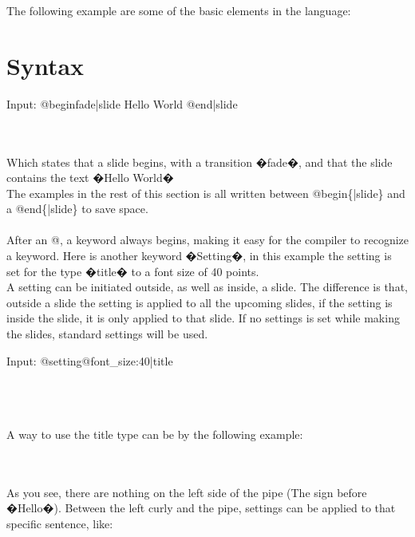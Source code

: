 The following example are some of the basic elements in the language:

\section{Syntax}

\begin{spverbatim}
Input:
@begin{fade|slide}
    Hello World
@end{|slide}
\end{spverbatim}

\\ \\
Which states that a slide begins, with a transition �fade�, and that the slide contains the text �Hello World� \\
The examples in the rest of this section is all written between @begin\{|slide\} and a @end\{|slide\} to save space.
\\ \\
After an @, a keyword always begins, making it easy for the compiler to recognize a keyword.
Here is another keyword �Setting�, in this example the setting is set for the type �title� to a font size of 40 points. \\
A setting can be initiated outside, as well as inside, a slide. The difference is that, outside a slide the setting is applied to all the upcoming slides, if the setting is inside the slide, it is only applied to that slide. If no settings is set while making the slides, standard settings will be used.

\begin{spverbatim}
Input: @setting{@font_size:40|title}
\end{spverbatim}

 \\
\\ \\
A way to use the title type can be by the following example:\\

\begin{spverbatim}
Input:   @title\{|Hello and welcome}
\end{spverbatim}

\\ \\
As you see, there are nothing on the left side of the pipe (The sign before �Hello�). Between the left curly and the pipe, settings can be applied to that specific sentence, like:\\

